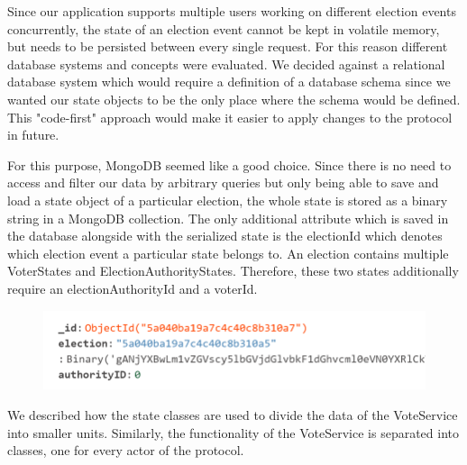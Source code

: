Since our application supports multiple users working on different election events concurrently, the state of an election event cannot be kept in volatile memory, but needs to be persisted between every single request. For this reason different database systems and concepts were evaluated. We decided against a relational database system which would require a definition of a database schema since we wanted our state objects to be the only place where the schema would be defined. This "{}code-first"{} approach would make it easier to apply changes to the protocol in future.

For this purpose, MongoDB seemed like a good choice. Since there is no need to access and filter our data by arbitrary queries but only being able to save and load a state object of a particular election, the whole state is stored as a binary string in a MongoDB collection. The only additional attribute which is saved in the database alongside with the serialized state is the electionId which denotes which election event a particular state belongs to. An election contains multiple VoterStates and ElectionAuthorityStates. Therefore, these two states additionally require an electionAuthorityId and a voterId.

\begin{figure}
\begin{center}
\includegraphics[scale=0.75]{assets/db.png}
\label{dbexample}%
\end{center}
\end{figure}

We described how the state classes are used to divide the data of the VoteService into smaller units. Similarly, the functionality of the VoteService is separated into classes, one for every actor of the protocol.

